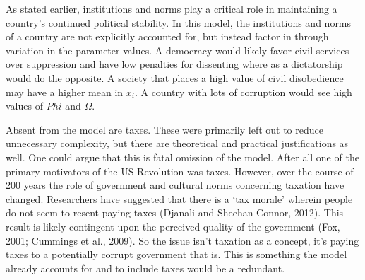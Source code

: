 \documentclass[12pt]{article}
\begin{document}
\begin{spacing}{1.5}

As stated earlier, institutions and norms play a critical role in maintaining a country's continued political stability. In this model, the institutions and norms of a country are not explicitly accounted for, but instead factor in through variation in the parameter values. A democracy would likely favor civil services over suppression and have low penalties for dissenting where as a dictatorship would do the opposite. A society that places a high value of civil disobedience may have a higher mean in $x_i$. A country with lots of corruption would see high values of $Phi$ and $\Omega$.   

Absent from the model are taxes. These were primarily left out to reduce unnecessary complexity, but there are theoretical and practical justifications as well. One could argue that this is fatal omission of the model. After all one of the primary motivators of the US Revolution was taxes. However, over the course of 200 years the role of government and cultural norms concerning taxation have changed. Researchers have suggested that there is a `tax morale' wherein people do not seem to resent paying taxes (Djanali and Sheehan-Connor, 2012). This result is likely contingent upon the perceived quality of the government (Fox, 2001; Cummings et al., 2009). So the issue isn't taxation as a concept, it's paying taxes to a potentially corrupt government that is. This is something the model already accounts for and to include taxes would be a redundant.  





\end{spacing}
\end{document}
